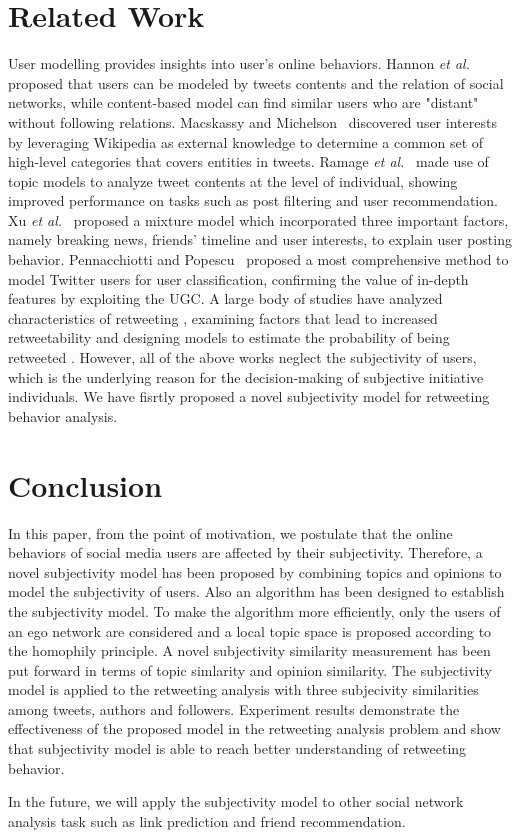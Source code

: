 \documentclass[letterpaper]{article}
\begin{document}
\section{Related Work}
\label{relatedwork}
   
User modelling provides insights into user's online behaviors. 
Hannon \emph{et al.}~ proposed that users can be modeled by tweets contents and the relation of social networks, while content-based model can find similar users who are "distant" without following relations. 
Macskassy and Michelson~ discovered user interests by leveraging Wikipedia as external knowledge to determine a common set of high-level categories that covers entities in tweets. 
Ramage \emph{et al.}~ made use of topic models to analyze tweet contents at the level of individual, showing improved performance on tasks such as post filtering and user recommendation. 
Xu \emph{et al.}~ proposed a mixture model which incorporated three important factors, namely breaking news, friends' timeline and user interests, to explain user posting behavior.
Pennacchiotti and Popescu~ proposed a most comprehensive method to model Twitter users for user classification, confirming the value of in-depth features by exploiting the UGC. 
A large body of studies have analyzed characteristics of retweeting \cite{macskassy2011people,Luo:2013RMF}, examining factors that lead to increased retweetability \cite{suh2010want,comarela2012understanding} and designing models to estimate the probability of being retweeted \cite{petrovic2011rt,jenders2013analyzing,pfitzner2012emotional}. However, all of the above works neglect the subjectivity of users, which is the underlying reason for the decision-making of subjective initiative individuals. We have fisrtly proposed a novel subjectivity model for retweeting behavior analysis. 

\section{Conclusion}
In this paper, from the point of motivation, we postulate that the online behaviors of social media users are affected by their subjectivity. Therefore, a novel subjectivity model has been proposed by combining topics and opinions to model the subjectivity of users. Also an algorithm has been designed to establish the subjectivity model. To make the algorithm more efficiently, only the users of an ego network are considered and a local topic space is proposed according to the homophily principle. A novel subjectivity similarity measurement has been put forward in terms of topic simlarity and opinion similarity. The subjectivity model is applied to the retweeting analysis with three subjecivity similarities among tweets, authors and followers. 
Experiment results demonstrate the effectiveness of the proposed model in the retweeting analysis problem and show that subjectivity model is able to reach better understanding of retweeting behavior. 

In the future, we will apply the subjectivity model to other social network analysis task such as link prediction and friend recommendation. 



\end{document}
